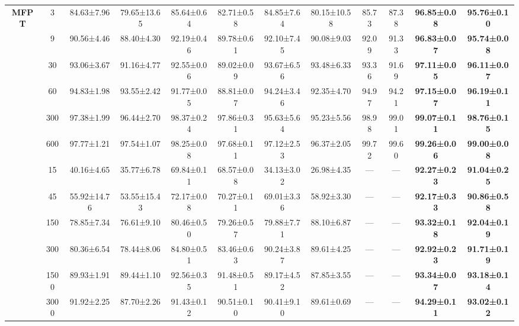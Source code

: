 \documentclass[journal]{IEEEtran}
\begin{document}
\begin{table}[!t]
\begin{tabular}{@{\hspace{2pt}}c|c|cc|cc|cc|c|c|cc@{\hspace{2pt}}}
  \multirow{8}{*}{\textbf{MFPT}} 
  & 3    & 84.63±7.96   & 79.65±13.65  & 85.64±0.64  & 82.71±0.58  & 84.85±7.64  & 80.15±10.58 & 85.73  & 87.38  & \textbf{96.85±0.08}  & \textbf{95.76±0.10} \\
  & 9    & 90.56±4.46   & 88.40±4.30   & 92.19±0.46  & 89.78±0.61  & 92.10±7.45  & 90.08±9.03  & 92.09  & 91.33  & \textbf{96.83±0.07}  & \textbf{95.74±0.08} \\
  & 30   & 93.06±3.67   & 91.16±4.77   & 92.55±0.06  & 89.02±0.09  & 93.67±6.56  & 93.48±6.33  & 93.36  & 91.69  & \textbf{97.11±0.05}  & \textbf{96.11±0.07} \\
  & 60   & 94.83±1.98   & 93.55±2.42   & 91.77±0.05  & 88.81±0.07  & 94.24±3.46  & 92.35±4.70  & 94.97  & 94.21  & \textbf{97.15±0.07}  & \textbf{96.19±0.11} \\
  & 300  & 97.38±1.99   & 96.44±2.70   & 98.37±0.24  & 97.86±0.31  & 95.63±5.64  & 95.23±5.56  & 98.98  & 99.01  & \textbf{99.07±0.11}  & \textbf{98.76±0.15} \\
  & 600  & 97.77±1.21   & 97.54±1.07   & 98.25±0.08  & 97.68±0.11  & 97.12±2.53  & 96.37±2.05  & 99.72  & 99.60  & \textbf{99.26±0.06}  & \textbf{99.00±0.08} \\
  
  \midrule
  
  \multirow{6}{*}{\textbf{XJTU-SY}} 
  & 15   & 40.16±4.65   & 35.77±6.78   & 69.84±0.11  & 68.57±0.08  & 34.13±3.02  & 26.98±4.35  & ---       & ---       & \textbf{92.27±0.23}  & \textbf{91.04±0.25} \\
  & 45   & 55.92±14.76  & 53.55±15.43  & 72.17±0.08  & 70.27±0.11  & 69.01±3.36  & 58.92±3.30  & ---       & ---       & \textbf{92.17±0.33}  & \textbf{90.86±0.58} \\
  & 150  & 78.85±7.34   & 76.61±9.10   & 80.46±0.50  & 79.26±0.57  & 79.88±7.71  & 88.10±6.87  & ---       & ---       & \textbf{93.32±0.18}  & \textbf{92.04±0.19} \\
  & 300  & 80.36±6.54   & 78.44±8.06   & 84.80±0.51  & 83.46±0.63  & 90.24±3.87  & 89.61±4.25  & ---       & ---       & \textbf{92.92±0.23}  & \textbf{91.71±0.19} \\
  & 1500 & 89.93±1.91   & 89.44±1.10   & 92.56±0.35  & 91.48±0.51  & 89.17±4.52  & 87.85±3.55  & ---       & ---       & \textbf{93.34±0.07}  & \textbf{93.18±0.14} \\
  & 3000 & 91.92±2.25   & 87.70±2.26   & 91.43±0.12  & 90.51±0.10  & 90.41±9.10  & 89.61±0.69  & ---       & ---       & \textbf{94.29±0.11}  & \textbf{93.02±0.12} \\
  

\end{tabular}
\end{table}
\end{document}
